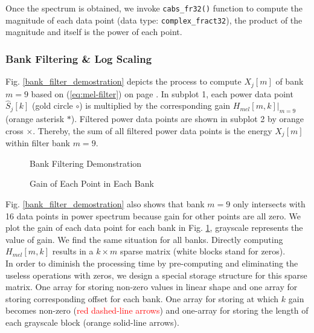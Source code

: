 Once the spectrum is obtained, we invoke \texttt{cabs\_fr32()} function to compute the magnitude of each data point (data type: \texttt{complex\_fract32}), the product of the magnitude and itself is the power of each point.


\subsubsection{Bank Filtering \& Log Scaling}

Fig. \ref{bank_filter_demostration} depicts the process to compute $X_j[m]$ of bank $m = 9$ based on (\ref{eq:mel-filter}) on page \pageref{eq:mel-filter}. In subplot 1, each power data point $\hat{S}_j[k]$ (\textcolor{gold_matlab}{gold circle $\circ$}) is multiplied by the corresponding gain $H_{mel}[m, k]|_{m=9}$ (\textcolor{orange_matlab}{orange asterisk $*$}). Filtered power data points are shown in subplot 2 by \textcolor{orange_matlab}{orange cross $\times$}. Thereby, the sum of all filtered power data points is the energy $X_j[m]$ within filter bank $m = 9$.

\begin{figure}[H]
\begin{minipage}[t]{0.5\linewidth}
\centering
{}
\caption{Bank Filtering Demonstration}
\label{bank_filter_demostration}
\end{minipage}
\begin{minipage}[t]{0.5\linewidth}
\centering
{}
\caption{Gain of Each Point in Each Bank}
\label{mel_filter_bank_gain}
\end{minipage}
\end{figure}

Fig. \ref{bank_filter_demostration} also shows that bank $m=9$ only intersects with 16 data points in power spectrum because gain for other points are all zero. We plot the gain of each data point for each bank in Fig. \ref{mel_filter_bank_gain}, grayscale represents the value of gain. We find the same situation for all banks. Directly computing $H_{mel}[m, k]$ results in a $k \times m$ sparse matrix (white blocks stand for zeros).\\

In order to diminish the processing time by pre-computing and eliminating the useless operations with zeros, we design a special storage structure for this sparse matrix. One array for storing non-zero values in linear shape and one array for storing corresponding offset for each bank. One array for storing at which $k$ gain becomes non-zero (\textcolor{red}{red dashed-line arrows}) and one-array for storing the length of each grayscale block (\textcolor{orange_html}{orange solid-line arrows}).\\

